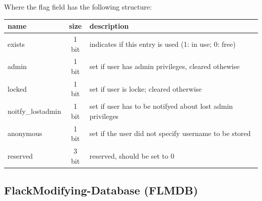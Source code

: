 Where the flag field has the following structure: \\
\begin{tabular}{|l|c|l|} \hline
name & size & description \\ \hline 
exists         & 1 bit    &  indicates if this entry is used (1: in use; 0: free)\\
admin  & 1 bit & set if user has admin privileges, cleared othewise \\
locked  & 1 bit & set if user is locke; cleared otherwise \\
noitfy\_lostadmin  & 1 bit & set if user has to be notifyed about lost admin privileges \\
anonymous  & 1 bit & set if the user did not specify username to be stored \\
reserved & 3 bit & reserved, should be set to 0\\ \hline
\end{tabular} 



\subsection{FlackModifying-Database (FLMDB)}




